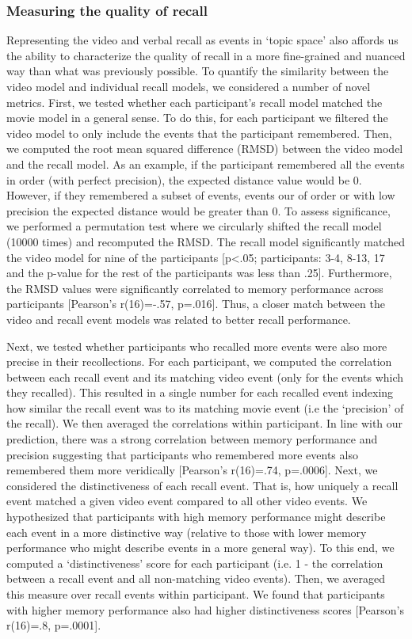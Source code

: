 \documentclass{article}
\begin{document}
{%

\subsubsection{Measuring the quality of recall}
Representing the video and verbal recall as events in `topic space' also affords us the ability to characterize the quality of recall in a more fine-grained and nuanced way than what was previously possible. To quantify the similarity between the video model and individual recall models, we considered a number of novel metrics.  First, we tested whether each participant's recall model matched the movie model in a general sense. To do this, for each participant we filtered the video model to only include the events that the participant remembered. Then, we computed the root mean squared difference (RMSD) between the video model and the recall model. As an example, if the participant remembered all the events in order (with perfect precision), the expected distance value would be 0. However, if they remembered a subset of events, events our of order or with low precision the expected distance would be greater than 0. To assess significance, we performed a permutation test where we circularly shifted the recall model (10000 times) and recomputed the RMSD. The recall model significantly matched the video model for nine of the participants [p<.05; participants: 3-4, 8-13, 17 and the p-value for the rest of the participants was less than .25]. Furthermore, the RMSD values were significantly correlated to memory performance across participants [Pearson's r(16)=-.57, p=.016]. Thus, a closer match between the video and recall event models was related to better recall performance.

Next, we tested whether participants who recalled more events were also more precise in their recollections. For each participant, we computed the correlation between each recall event and its matching video event (only for the events which they recalled). This resulted in a single number for each recalled event indexing how similar the recall event was to its matching movie event (i.e the `precision' of the recall). We then averaged the correlations within participant. In line with our prediction, there was a strong correlation between memory performance and precision suggesting that participants who remembered more events also remembered them more veridically [Pearson's r(16)=.74, p=.0006]. Next, we considered the distinctiveness of each recall event. That is, how uniquely a recall event matched a given video event compared to all other video events. We hypothesized that participants with high memory performance might describe each event in a more distinctive way (relative to those with lower memory performance who might describe events in a more general way). To this end, we computed a `distinctiveness' score for each participant (i.e. 1 - the correlation between a recall event and all non-matching video events).  Then, we averaged this measure over recall events within participant.  We found that participants with higher memory performance also had higher distinctiveness scores [Pearson's r(16)=.8, p=.0001].

}
\end{document}

